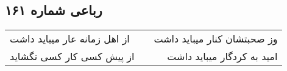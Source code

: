\begin{center}
\section*{رباعی شماره ۱۶۱}
\label{sec:sh161}
\begin{longtable}{l p{0.5cm} r}
از اهل زمانه عار میباید داشت
&&
وز صحبتشان کنار میباید داشت
\\
از پیش کسی کار کسی نگشاید
&&
امید به کردگار میباید داشت
\\
\end{longtable}
\end{center}
